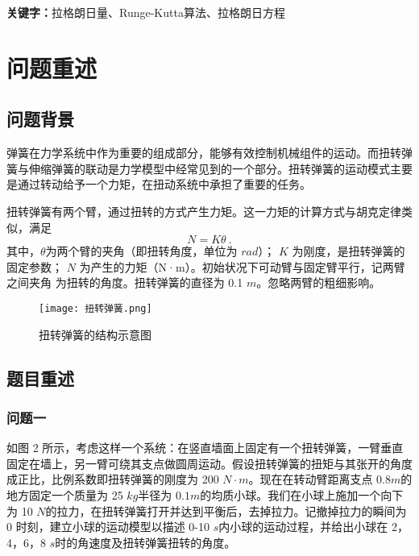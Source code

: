 \documentclass[a4paper,c5size,twoside,UTF8]{ctexart} %
\numberwithin{equation}{section}   %
\begin{document}
   \par   
   \noindent  \textbf{关键字：}拉格朗日量、Runge-Kutta算法、拉格朗日方程%
   \newpage
   
   \thispagestyle{empty}

   
	\tableofcontents


   
   \newpage



\section{问题重述}

\subsection{问题背景}



弹簧在力学系统中作为重要的组成部分，能够有效控制机械组件的运动。而扭转弹簧与伸缩弹簧的联动是力学模型中经常见到的一个部分。扭转弹簧的运动模式主要是通过转动给予一个力矩，在扭动系统中承担了重要的任务。

扭转弹簧有两个臂，通过扭转的方式产生力矩。这一力矩的计算方式与胡克定律类似，满足
\begin{equation}
	N=K\theta~.
\end{equation}
其中，$\theta$为两个臂的夹角（即扭转角度，单位为 $rad$）； $K$ 为刚度，是扭转弹簧的固定参数； $N$ 为产生的力矩（N·m）。初始状况下可动臂与固定臂平行，记两臂之间夹角 为扭转的角度。扭转弹簧的直径为 0.1 $m$。忽略两臂的粗细影响。

\begin{figure}[H]
	\centering
	\texttt{[image: 扭转弹簧.png]}
	\caption{扭转弹簧的结构示意图}
\end{figure}

\subsection{题目重述}

\subsubsection*{问题一}

如图 2 所示，考虑这样一个系统：在竖直墙面上固定有一个扭转弹簧，一臂垂直固定在墙上，另一臂可绕其支点做圆周运动。假设扭转弹簧的扭矩与其张开的角度成正比，比例系数即扭转弹簧的刚度为 200 $N\cdot m$。现在在转动臂距离支点 $0.8 m$的地方固定一个质量为 25 $kg$半径为 $0.1 m$的均质小球。我们在小球上施加一个向下为 10 $N$的拉力，在扭转弹簧打开并达到平衡后，去掉拉力。记撤掉拉力的瞬间为 0 时刻，建立小球的运动模型以描述 0-10 $s$内小球的运动过程，并给出小球在 2，4，6，8 $s$时的角速度及扭转弹簧扭转的角度。
\end{document}
